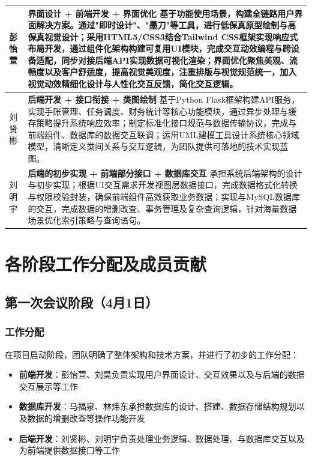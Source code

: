 \documentclass[a4paper]{article}
\begin{document}
\begin{longtable}{|p{2.5cm}|p{12cm}|}
彭怡萱 & \textbf{界面设计 + 前端开发 + 界面优化} \newline
基于功能使用场景，构建全链路用户界面解决方案。通过"即时设计"、"墨刀"等工具，进行低保真原型绘制与高保真视觉设计；采用HTML5/CSS3结合Tailwind CSS框架实现响应式布局开发，通过组件化架构构建可复用UI模块，完成交互动效编程与跨设备适配，同步对接后端API实现数据可视化渲染；界面优化聚焦美观、流畅度以及客户舒适度，提高视觉美观度，注重排版与视觉规范统一，加入视觉动效精细化设计与人性化交互反馈，简化交互逻辑。 \\
\hline

刘贤彬 & \textbf{后端开发 + 接口衔接 + 类图绘制} \newline
基于Python Flask框架构建API服务，实现手账管理、任务调度、财务统计等核心功能模块，通过异步处理与缓存策略提升系统响应效率；制定标准化接口规范与数据传输协议，完成与前端组件、数据库的数据交互联调；运用UML建模工具设计系统核心领域模型，清晰定义类间关系与交互逻辑，为团队提供可落地的技术实现蓝图。 \\
\hline

刘明宇 & \textbf{后端的初步实现 + 前端部分接口 + 数据库交互} \newline
承担系统后端架构的设计与初步实现；根据UI交互需求开发视图层数据接口，完成数据格式化转换与权限校验封装，确保前端组件高效获取业务数据；实现与MySQL数据库的交互，完成数据的增删改查、事务管理及复杂查询逻辑，针对海量数据场景优化索引策略与查询语句。 \\
\hline

\end{longtable}

\section{各阶段工作分配及成员贡献}

\subsection{第一次会议阶段（4月1日）}

\subsubsection{工作分配}

在项目启动阶段，团队明确了整体架构和技术方案，并进行了初步的工作分配：

\begin{itemize}
    \item \textbf{前端开发}：彭怡萱、刘昊负责实现用户界面设计、交互效果以及与后端的数据交互展示等工作
    \item \textbf{数据库开发}：马福泉、林炜东承担数据库的设计、搭建、数据存储结构规划以及数据的增删改查等操作功能开发
    \item \textbf{后端开发}：刘贤彬、刘明宇负责处理业务逻辑、数据处理、与数据库交互以及为前端提供数据接口等工作
\end{itemize}
\end{document}
